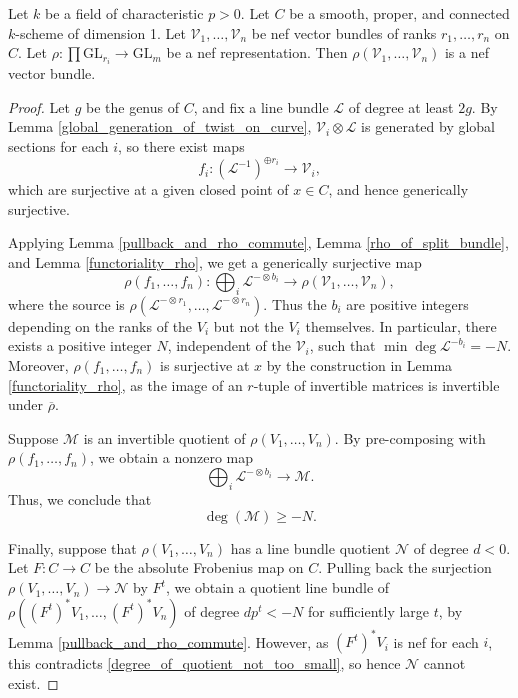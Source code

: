 \begin{lemma}\label{no_negative_quotient_on_curve_p}
Let $k$ be a field of characteristic $p > 0$.
Let $C$ be a smooth, proper, and connected $k$-scheme of dimension 1.
Let $\mathcal{V}_1,\ldots,\mathcal{V}_n$ be nef vector bundles of
ranks $r_1,\ldots,r_n$ on $C$.
Let $\rho : \prod \mathrm{GL}_{r_i}\to \mathrm{GL}_m$ be a nef
representation.
Then $\rho(\mathcal{V}_1,\ldots,\mathcal{V}_n)$ is a nef vector bundle.
\end{lemma}
\begin{proof}
Let $g$ be the genus of $C$, and fix a line bundle $\mathcal{L}$ of degree at
least $2g$.
By Lemma \ref{global_generation_of_twist_on_curve},
$\mathcal{V}_i \otimes\mathcal{L}$ is generated by global sections for each
$i$, so there exist maps
$$
  f_i : (\mathcal{L}^{-1})^{\oplus r_i} \to \mathcal{V}_i,
$$
which are surjective at a given closed point of $x \in C$, and hence
generically surjective.

Applying Lemma \ref{pullback_and_rho_commute}, Lemma \ref{rho_of_split_bundle},
and Lemma \ref{functoriality_rho}, we get a generically surjective map
$$
  \rho(f_1,\ldots,f_n) :
    \bigoplus_i \mathcal{L}^{-\otimes b_i} \to
    \rho(\mathcal{V}_1,\ldots,\mathcal{V}_n),
$$
where the source is
$\rho(\mathcal{L}^{-\otimes r_1},\ldots,\mathcal{L}^{-\otimes r_n})$.
Thus the $b_i$ are positive integers depending on the ranks of the $V_i$ but
not the $V_i$ themselves.
In particular, there exists a positive integer $N$, independent of the
$\mathcal{V}_i$, such that $\min\deg\mathcal{L}^{-b_i} = -N$.
Moreover, $\rho(f_1,\ldots,f_n)$ is surjective at $x$ by the construction in
Lemma \ref{functoriality_rho}, as the image of an $r$-tuple of invertible
matrices is invertible under $\overline{\rho}$.

Suppose $\mathcal{M}$ is an invertible quotient of $\rho(V_1,\ldots,V_n)$.
By pre-composing with $\rho(f_1,\ldots,f_n)$, we obtain a nonzero map
$$
  \bigoplus_i \mathcal{L}^{-\otimes b_i} \to \mathcal{M}.
$$
Thus, we conclude that
\begin{equation}\label{degree_of_quotient_not_too_small}
  \deg(\mathcal{M}) \ge -N.
\end{equation}

Finally, suppose that $\rho(V_1,\ldots,V_n)$ has a line bundle quotient
$\mathcal{N}$ of degree $d < 0$.
Let $F : C \to C$ be the absolute Frobenius map on $C$.
Pulling back the surjection $\rho(V_1,\ldots,V_n) \to \mathcal{N}$ by $F^t$,
we obtain a quotient line bundle of
$\rho((F^t)^* V_1,\ldots,(F^t)^* V_n)$ of degree $dp^t < -N$ for sufficiently
large $t$, by Lemma \ref{pullback_and_rho_commute}.
However, as $(F^{t})^*V_i$ is nef for each $i$, this contradicts
\eqref{degree_of_quotient_not_too_small}, so hence $\mathcal{N}$ cannot exist.
\end{proof}

